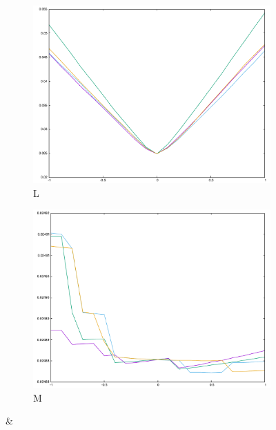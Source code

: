 \begin{figure}[H]
\begin{subfigure}{.33\textwidth}
\end{subfigure}\\
\begin{subfigure}{.33\textwidth}
	\includegraphics[width=\linewidth]{fig/ajherr/t3r/L_mae.pdf}
	\caption{L}
\end{subfigure}%
\begin{subfigure}{.33\textwidth}
	\includegraphics[width=\linewidth]{fig/ajherr/t3r/M_mae.pdf}
	\caption{M}
\end{subfigure}&
\begin{subfigure}{.33\textwidth}

\end{subfigure}
\end{figure}

